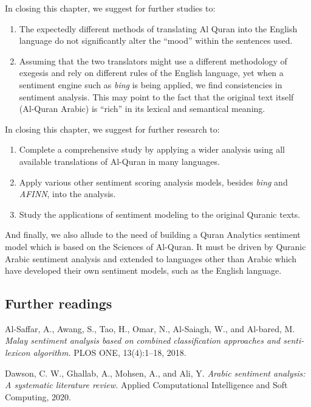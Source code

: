 \documentclass[
]{article}
\providecommand{\tightlist}{%
  \setlength{\itemsep}{0pt}\setlength{\parskip}{0pt}}
\begin{document}
In closing this chapter, we suggest for further studies to:

\begin{enumerate}
\def\labelenumi{\arabic{enumi}.}
\tightlist
\item
  The expectedly different methods of translating Al Quran into the English language do not significantly alter the ``mood'' within the sentences used.
\item
  Assuming that the two translators might use a different methodology of exegesis and rely on different rules of the English language, yet when a sentiment engine such as \emph{bing} is being applied, we find consistencies in sentiment analysis. This may point to the fact that the original text itself (Al-Quran Arabic) is ``rich'' in its lexical and semantical meaning.
\end{enumerate}

In closing this chapter, we suggest for further research to:

\begin{enumerate}
\def\labelenumi{\arabic{enumi}.}
\tightlist
\item
  Complete a comprehensive study by applying a wider analysis using all available translations of Al-Quran in many languages.
\item
  Apply various other sentiment scoring analysis models, besides \emph{bing} and \emph{AFINN}, into the analysis.
\item
  Study the applications of sentiment modeling to the original Quranic texts.
\end{enumerate}

And finally, we also allude to the need of building a Quran Analytics sentiment model which is based on the Sciences of Al-Quran. It must be driven by Quranic Arabic sentiment analysis and extended to languages other than Arabic which have developed their own sentiment models, such as the English language.

\hypertarget{further-readings-2}{%
\subsection{Further readings}\label{further-readings-2}}

Al-Saffar, A., Awang, S., Tao, H., Omar, N., Al-Saiagh, W., and Al-bared, M. \emph{Malay sentiment analysis based on combined classification approaches and senti-lexicon algorithm.} PLOS ONE, 13(4):1--18, 2018. \citep{alsaffar2018}

Dawson, C. W., Ghallab, A., Mohsen, A., and Ali, Y. \emph{Arabic sentiment analysis: A systematic literature review.} Applied Computational Intelligence and Soft Computing, 2020. \citep{dawson2020}
\end{document}
